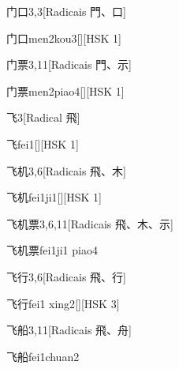\begin{entry}{门口}{3,3}[Radicais ⾨、⼝]
  \begin{phonetics}{门口}{men2kou3}[][HSK 1]
  \end{phonetics}
\end{entry}

\begin{entry}{门票}{3,11}[Radicais ⾨、⽰]
  \begin{phonetics}{门票}{men2piao4}[][HSK 1]
  \end{phonetics}
\end{entry}

\begin{entry}{飞}{3}[Radical ⾶]
  \begin{phonetics}{飞}{fei1}[][HSK 1]
  \end{phonetics}
\end{entry}

\begin{entry}{飞机}{3,6}[Radicais ⾶、⽊]
  \begin{phonetics}{飞机}{fei1ji1}[][HSK 1]
  \end{phonetics}
\end{entry}

\begin{entry}{飞机票}{3,6,11}[Radicais ⾶、⽊、⽰]
  \begin{phonetics}{飞机票}{fei1ji1 piao4}
  \end{phonetics}
\end{entry}

\begin{entry}{飞行}{3,6}[Radicais ⾶、⾏]
  \begin{phonetics}{飞行}{fei1 xing2}[][HSK 3]
  \end{phonetics}
\end{entry}

\begin{entry}{飞船}{3,11}[Radicais ⾶、⾈]
  \begin{phonetics}{飞船}{fei1chuan2}
  \end{phonetics}
\end{entry}

